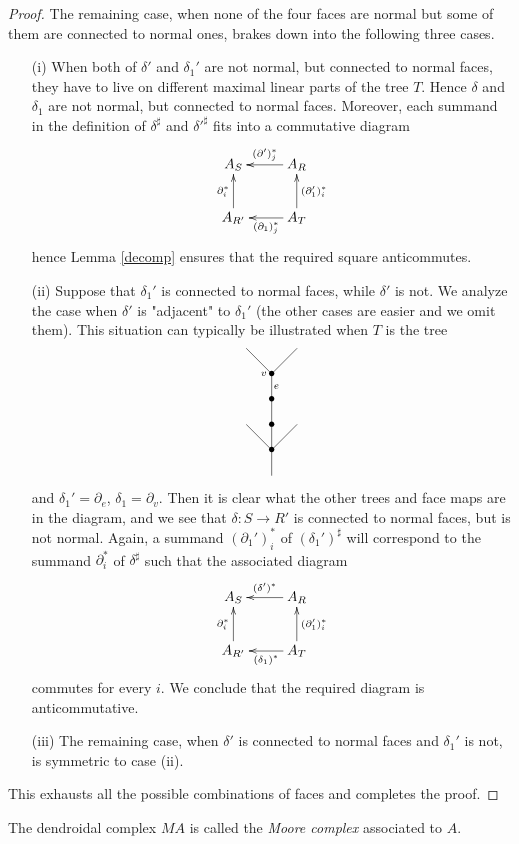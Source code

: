 \documentclass[a4paper]{amsart}
\theoremstyle{plain}
\theoremstyle{definition}
\theoremstyle{remark}
\newcommand{\To}{\longrightarrow}
\numberwithin{equation}{section}
\numberwithin{figure}{section}
\begin{document}
\begin{proof}
    The remaining case, when none of the four faces are normal but some of them are connected to normal ones, brakes down into the following three cases.
    \begin{itemize}
        \item[{\rm (i)}] When both of $\delta'$ and $\delta_1'$ are not normal, but connected to normal faces, they have to live on different maximal linear parts of the tree $T$. Hence $\delta$ and $\delta_1$ are not  normal, but connected to normal faces. Moreover, each summand in the definition of $ \delta^\sharp$ and $\delta'^\sharp$ fits into a commutative diagram
              \[
                  \xymatrix{A_S &A_R\ar[l]_-{(\partial')_j^*}\\
                  A_{R'}\ar[u]^{\partial_i^*} &A_T\ar[l]^-{(\partial_1)_j^*}\ar[u]_{(\partial_1')_i^*}}
              \]
              hence Lemma \ref{decomp} ensures that the required square anticommutes.
        \item[{\rm (ii)}] Suppose that $\delta_1'$ is connected to normal faces, while $\delta'$ is not. We analyze the case when $\delta'$ is "adjacent" to $\delta_1'$ (the other cases are easier and we omit them). This situation can typically be illustrated when $T$ is the tree
              \[
                  \xy<0.08cm,0cm>:
                  (0,0)*=0{}="1";
                  (0,8)*=0{\bullet}="2";
                  (-8,16)*=0{}="3";
                  (0,16)*=0{\bullet}="4";
                  (8,16)*=0{}="5";
                  (0,24)*=0{\bullet}="6";
                  (0,32)*=0{\bullet}="7";
                  (-8,40)*=0{}="8";
                  (8,40)*=0{}="9";
                  (-2.5,32)*{\scriptstyle v};
                  (1.5,28)*{\scriptstyle e};
                  "1";"2" **\dir{-};
                  "2";"3" **\dir{-};
                  "2";"4" **\dir{-};
                  "2";"5" **\dir{-};
                  "4";"6" **\dir{-};
                  "6";"7" **\dir{-};
                  "7";"8" **\dir{-};
                  "7";"9" **\dir{-};
                  \endxy
              \]
              and $\delta_1'=\partial_e$, $\delta_1=\partial_v$. Then it is clear what the other trees and face maps are in the diagram, and we see that $\delta\colon S\To R'$ is connected to normal faces, but is not normal. Again, a summand $(\partial_1')^*_i$ of $(\delta_1')^\sharp$ will correspond to the summand $\partial_i^*$ of $\delta^\sharp$ such that the associated diagram
              \[
                  \xymatrix{A_S &A_R\ar[l]_-{(\delta')^*}\\
                  A_{R'}\ar[u]^{\partial_i^*} &A_T\ar[l]^-{(\delta_1)^*}\ar[u]_{(\partial_1')_i^*}}
              \]
              commutes for every $i$. We conclude that the required diagram is anticommutative.
        \item[{\rm (iii)}] The remaining case, when $\delta'$ is connected to normal faces and $\delta_1'$ is not, is symmetric to case (ii).
    \end{itemize}
    This exhausts all the possible combinations of faces and completes the proof.
\end{proof}
The dendroidal complex $MA$ is called the \emph{Moore complex} associated to $A$.
\end{document}
